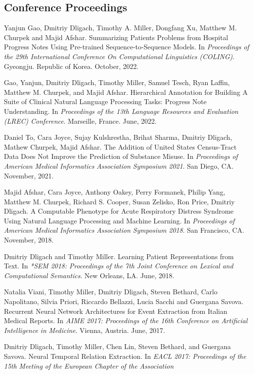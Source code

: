 \documentclass[letterpaper]{article}
\renewenvironment{itemize}{
  \begin{list}{}{
    \setlength{\leftmargin}{1.5em}
  }
}{
  \end{list}
}
\begin{document}
\subsection*{Conference Proceedings}

\begin{itemize}
\item Yanjun Gao, Dmitriy Dligach, Timothy A. Miller, Dongfang Xu, Matthew M. Churpek and Majid Afshar. Summarizing Patients Problems from Hospital Progress Notes Using Pre-trained Sequence-to-Sequence Models. In \emph{Proceedings of the 29th International Conference On Computational Linguistics (COLING)}. Gyeongju. Republic of Korea. October, 2022.
\item Gao, Yanjun, Dmitriy Dligach, Timothy Miller, Samuel Tesch, Ryan Laffin, Matthew M. Churpek, and Majid Afshar. Hierarchical Annotation for Building A Suite of Clinical Natural Language Processing Tasks: Progress Note Understanding. In \emph{Proceedings of the 13th Language Resources and Evaluation (LREC) Conference}. Marseille, France. June, 2022.
\item Daniel To, Cara Joyce, Sujay Kulshrestha, Brihat Sharma, Dmitriy Dligach, Mathew Churpek, Majid Afshar. The Addition of United States Census-Tract Data Does Not Improve the Prediction of Substance Misuse. In \emph{Proceedings of American Medical Informatics Association Symposium 2021}. San Diego, CA. November, 2021.
\item Majid Afshar, Cara Joyce, Anthony Oakey, Perry Formanek, Philip Yang, Matthew M. Churpek, Richard S. Cooper, Susan Zelisko, Ron Price, Dmitriy Dligach. A Computable Phenotype for Acute Respiratory Distress Syndrome Using Natural Language Processing and Machine Learning. In \emph{Proceedings of American Medical Informatics Association Symposium 2018}. San Francisco, CA. November, 2018.
\item Dmitriy Dligach and Timothy Miller. Learning Patient Representations from Text. In \emph{*SEM 2018: Proceedings of the 7th Joint Conference on Lexical and Computational Semantics}. New Orleans, LA. June, 2018.
\item Natalia Viani, Timothy Miller, Dmitriy Dligach, Steven Bethard, Carlo Napolitano, Silvia Priori, Riccardo Bellazzi, Lucia Sacchi and Guergana Savova. Recurrent Neural Network Architectures for Event Extraction from Italian Medical Reports. In \emph{AIME 2017: Proceedings of the 16th Conference on Artificial Intelligence in Medicine}. Vienna, Austria. June, 2017.
\item Dmitriy Dligach, Timothy Miller, Chen Lin, Steven Bethard, and Guergana Savova. Neural Temporal Relation Extraction. In \emph{EACL 2017: Proceedings of the 15th Meeting of the European Chapter of the Association
}
\end{itemize}
\end{document}
